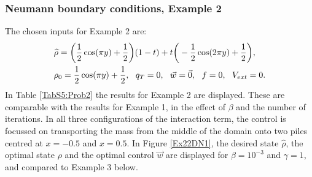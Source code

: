 \subsubsection{Neumann boundary conditions, Example 2} 
The chosen inputs for Example 2 are:
\begin{align*}
&\widehat \rho = \bigg(\frac{1}{2}\cos(\pi y) + \frac{1}{2}\bigg)(1-t) + t\bigg(-\frac{1}{2}\cos(2 \pi y) + \frac{1}{2}\bigg),\\
&\rho_{0} = \frac{1}{2}\cos(\pi y) + \frac{1}{2},\ \
q_{T} = 0,\ \
\vec{w} = \vec{0},\ \
f =0,\ \
V_{ext} =0.
\end{align*}
In Table \ref{TabS5:Prob2} the results for Example 2 are displayed. These are comparable with the results for Example 1, in the effect of $\beta$ and the number of iterations. In all three configurations of the interaction term, the control is focussed on transporting the mass from the middle of the domain onto two piles centred at $x=-0.5$ and $x=0.5$. In Figure \ref{Ex22DN1}, the desired state $\widehat \rho$, the optimal state $\rho$ and the optimal control $\vec{w}$ are displayed for $\beta = 10^{-3}$ and $\gamma = 1$, and compared to Example 3 below. 
%


